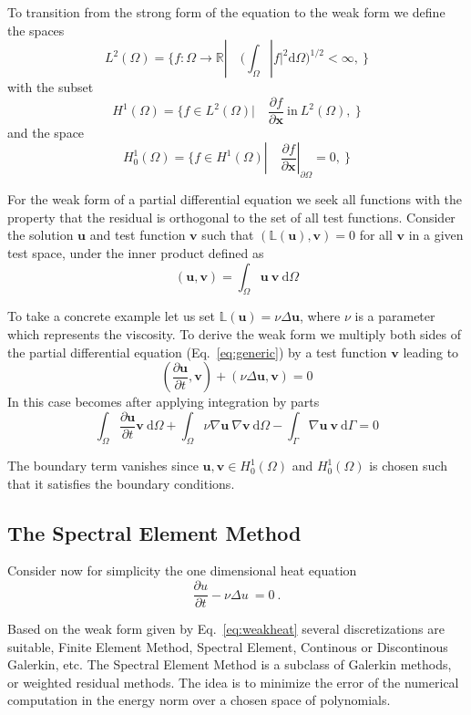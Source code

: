 \documentclass[10pt]{article}
\renewcommand{\d}{\mathrm{d}}
\newcommand{\vect}[1]{\mathbf{#1} }
\begin{document}
To transition from the strong form of the equation to the weak form we define the spaces
$$
L^2(\Omega)=\lbrace f :\Omega\rightarrow \mathbb R |\quad \bigg(\int_{\Omega} |f|^2 \d \Omega \bigg)^{1/2}<\infty,\ \rbrace
$$
with the subset
$$
H^1(\Omega)=\lbrace f \in L^2(\Omega) |\quad \frac{\partial f}{\partial \vect x} \ \text{in}\  L^2(\Omega),\ \rbrace
$$
and the space
$$
H^1_0(\Omega)=\lbrace f \in H^1(\Omega) |\quad \frac{\partial f}{\partial \vect x}|_{\partial\Omega}=0 ,\ \rbrace
$$

For the weak form of a partial differential equation we seek all functions with the property that the residual is orthogonal to the set of all test functions.
Consider the solution $\mathbf u$ and test function $\mathbf v$ such that
$(\mathbb L(\vect u),\mathbf v)=0$ for all $\mathbf v$ in a given test space, under the inner product defined as
$$(\mathbf u,\mathbf v)=\int_{\Omega} \mathbf u\ \mathbf v \ \d \Omega$$

To take a concrete example let us set $\mathbb L(\mathbf u) = \nu \Delta \mathbf u$, where $\nu$ is a parameter which represents the viscosity. To derive the weak form we multiply both sides of the partial differential equation (Eq.~\ref{eq:generic}) by a test function $\mathbf v$ leading to
$$(\frac{\partial\mathbf u}{\partial t},\mathbf v) + (\nu\Delta \mathbf u, \mathbf v) =0$$
In this case  becomes after applying integration by parts
\begin{equation}
\int_{\Omega}\frac{\partial\mathbf u}{\partial t} \mathbf v \ \d \Omega + \int_{\Omega} \nu\nabla \mathbf u\ \nabla \mathbf v\ \d \Omega -
 \int_{\Gamma} \nabla \mathbf u \ \mathbf v\  \d \Gamma =0\label{eq:weakheat}
\end{equation}

The boundary term vanishes since $\mathbf u, \mathbf v \in H^1_0(\Omega)$ and $H^1_0(\Omega)$ is chosen such that it satisfies the boundary conditions.
\subsection{The Spectral Element Method}
Consider now for simplicity the one dimensional heat equation
\begin{equation}
\frac{\partial u}{\partial t} - \nu\Delta u\ =0\ . \label{eq:1dheat}
\end{equation}


Based on the weak form given by Eq.~\ref{eq:weakheat} several discretizations are suitable, Finite Element Method, Spectral Element, Continous or Discontinous Galerkin, etc.
The Spectral Element Method is a subclass of Galerkin methods, or weighted residual methods. 
The idea is to minimize the error of the numerical computation in the energy norm over a 
chosen space of polynomials. 
\end{document}
